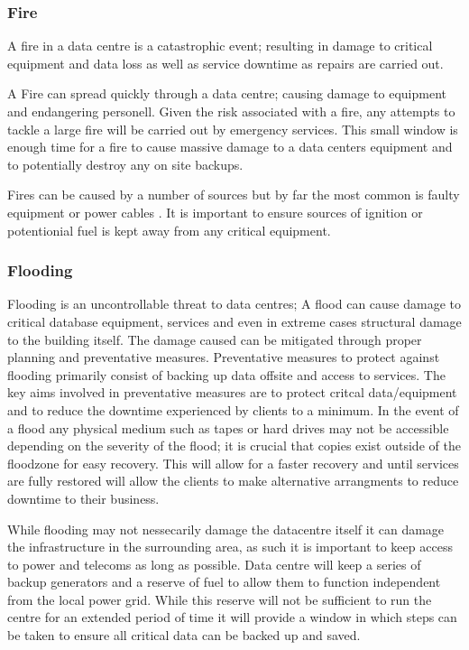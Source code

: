 \documentclass[11pt, twocolumn]{article}
\begin{document}
\subsubsection{Fire}
A fire in a data centre is a catastrophic event; resulting in damage to critical equipment and data loss as well as service downtime as repairs are carried out.

A Fire can spread quickly through a data centre; causing damage to equipment and endangering personell. Given the risk associated with a fire, any attempts to tackle a large fire will be carried out by emergency services.  This small window is enough time for a fire to cause massive damage to a data centers equipment and to potentially destroy any on site backups.

Fires can be caused by a number of sources but by far the most common is faulty equipment or power cables \cite{sean1}.  It is important to ensure sources of ignition or potentionial fuel is kept away from any critical equipment. 

\subsubsection{Flooding}
Flooding is an uncontrollable threat to data centres; A flood can cause damage to critical database equipment, services and even in extreme cases structural damage to the building itself. The damage caused can be mitigated through proper planning and preventative measures. Preventative measures to protect against flooding primarily consist of backing up data offsite and access to services.  The key aims involved in preventative measures are to protect critcal data/equipment and to reduce the downtime experienced by clients to a minimum.  In the event of a flood any physical medium such as tapes or hard drives may not be accessible depending on the severity of the flood; it is crucial that copies exist outside of the floodzone for easy recovery. This will allow for a faster recovery and until services are fully restored will allow the clients to make alternative arrangments to reduce downtime to their business.

While flooding may not nessecarily damage the datacentre itself it can damage the infrastructure in the surrounding area, as such it is important to keep access to power and telecoms as long as possible.  Data centre will keep a series of backup generators and a reserve of fuel to allow them to function independent from the local power grid.  While this reserve will not be sufficient to run the centre for an extended period of time it will provide a window in which steps can be taken to ensure all critical data can be backed up and saved.
\end{document}
